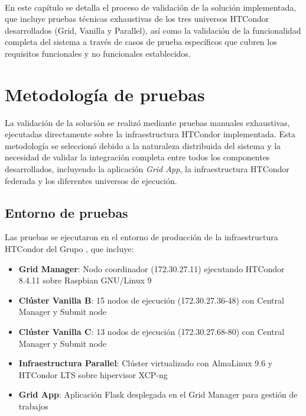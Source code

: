 \label{cap:validacion}
\mbox{}\\
En este capítulo se detalla el proceso de validación de la solución implementada, que incluye pruebas técnicas exhaustivas de los tres universos HTCondor desarrollados (Grid, Vanilla y Parallel), así como la validación de la funcionalidad completa del sistema a través de casos de prueba específicos que cubren los requisitos funcionales y no funcionales establecidos.

\section{Metodología de pruebas}
\noindent

La validación de la solución se realizó mediante pruebas manuales exhaustivas, ejecutadas directamente sobre la infraestructura HTCondor implementada. Esta metodología se seleccionó debido a la naturaleza distribuida del sistema y la necesidad de validar la integración completa entre todos los componentes desarrollados, incluyendo la aplicación \textit{Grid App}, la infraestructura HTCondor federada y los diferentes universos de ejecución.

\subsection{Entorno de pruebas}
\noindent

Las pruebas se ejecutaron en el entorno de producción de la infraestructura HTCondor del Grupo \GRID, que incluye:

\begin{itemize}
	\item \textbf{Grid Manager}: Nodo coordinador (172.30.27.11) ejecutando HTCondor 8.4.11 sobre Raspbian GNU/Linux 9
	\item \textbf{Clúster Vanilla B}: 15 nodos de ejecución (172.30.27.36-48) con Central Manager y Submit node
	\item \textbf{Clúster Vanilla C}: 13 nodos de ejecución (172.30.27.68-80) con Central Manager y Submit node  
	\item \textbf{Infraestructura Parallel}: Clúster virtualizado con AlmaLinux 9.6 y HTCondor LTS sobre hipervisor XCP-ng
	\item \textbf{Grid App}: Aplicación Flask desplegada en el Grid Manager para gestión de trabajos
\end{itemize}

